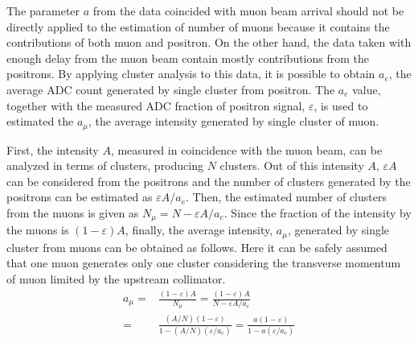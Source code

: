 \documentclass[preprint,3p,twocolumn]{elsarticle}
\begin{document}
The parameter $a$ from the data coincided with muon beam arrival should not be directly applied to the estimation of number of muons because it contains the contributions of both muon and positron. On the other hand, the data taken with enough delay from the muon beam contain mostly contributions from the positrons. By applying cluster analysis to this data, it is possible to obtain $a_e$, the average ADC count generated by single cluster from positron. The $a_e$ value, together with the measured ADC fraction of positron signal, $\varepsilon$, is used to estimated the $a_\mu$, the average intensity generated by single cluster of muon.

First, the intensity $A$, measured in coincidence with the muon beam, can be analyzed in terms of clusters, producing $N$ clusters. Out of this intensity $A$, $\varepsilon A$ can be considered from the positrons and the number of clusters generated by the positrons can be estimated as $\varepsilon A/a_e$. Then, the estimated number of clusters from the muons is given as $N_\mu=N-\varepsilon A/a_e$. Since the fraction of the intensity by the muons is $(1-\varepsilon)A$, finally, the average intensity, $a_\mu$, generated by single cluster from muons can be obtained as follows. Here it can be safely assumed that one muon generates only one cluster considering the transverse momentum of muon limited by the upstream collimator.
{	\fontsize{9pt}{0}
	\setlength{\mathindent}{0pt}
\setlength{\abovedisplayskip}{8pt}
\setlength{\belowdisplayskip}{5pt}
\begin{equation}
\begin{split}
a_\mu=&\frac{(1-\varepsilon)A}{N_\mu}=\frac{(1-\varepsilon)A}{N-\varepsilon A/a_e}\\ =&\frac{(A/N)(1-\varepsilon)}{1-(A/N)(\varepsilon/a_e)}=\frac{a(1-\varepsilon)}{1-a(\varepsilon /a_{e})}
\end{split}
\end{equation}
}
\end{document}
